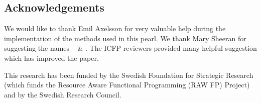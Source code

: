 %


%
%



\subsection*{Acknowledgements} 
We would like to thank Emil Axelsson for very valuable help 
during the implementation of the methods used in this pearl. We 
thank Mary Sheeran for suggesting the names \docname~ \& \studname. 
The ICFP reviewers provided many helpful suggestion which has improved the 
paper.

This research has been funded by the Swedish Foundation for
Strategic Research (which funds the Resource Aware Functional 
Programming (RAW FP) Project) and by the Swedish Research Council.

